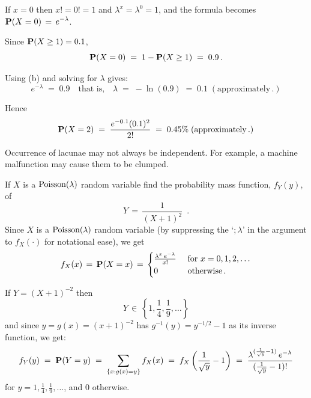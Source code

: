 \begin{ExerciseList}
\item If $x=0$ then $x!=0!=1$ and $\lambda^x=\lambda^0=1$, and the formula becomes  
$\displaystyle \mathbf{P}(X=0) \,=\, e^{-\lambda}$.

\item Since $\mathbf{P}(X \geq 1) = 0.1$, \[\mathbf{P}( X=0)\;=\; 1 -  \mathbf{P}(X \geq 1)\;=\; 0.9\,.\]

Using (b) and solving for $\lambda$ gives:
\[ e^{-\lambda}\;=\; 0.9 \quad \text{that is,}\quad \lambda \;=\; -\ln(0.9) \;=\; 0.1\;
(\text{approximately}\,.)\]

Hence \[\mathbf{P}( X=2 )\;=\;   \frac{e^{-0.1} (0.1)^2}{2!}  \;=\;0.45\% \;
(\text{approximately}\,.) \]

\item Occurrence of lacunae may not always be independent. For example, a machine malfunction may cause them to be clumped.
\ee

\Exercise
If $X$ is a $\mbox{{\rm Poisson}}(\lambda)$ random variable find the probability mass function,  $f_Y (y)$, of
\[
Y\,=\,\frac{1}{(X+1)^{2}} \enspace .
\]
\Answer
Since $X$ is a $\mbox{{\rm Poisson}}(\lambda)$ random variable (by suppressing the `$;\lambda$' in the argument to $f_X(\cdot)$ for notational ease), we get
\[ f_X(x) \,=\, \mathbf{P}(X=x)\,=\, 
\begin{cases}
\frac{\lambda^x \, e^{-\lambda} }{ x!} & \text{ for }  x= 0, 1, 2, \dots \\
0 & \text{ otherwise} \,.
\end{cases}
\]

If $Y=(X+1)^{-2}$ then  \[Y \,\in\, \left\{1, \frac{1}{4}, \frac{1}{9}, \dots \right\} \]
and since $y=g(x)=(x+1)^{-2}$ has $g^{-1}(y)=y^{-1/2}-1$ as its inverse function, we get:
\[
f_Y(y)\;=\; \mathbf{P}(Y=y)\;=\; \sum_{\{ x: g(x)=y\}}f_X(x)  \;=\; f_X\left( \frac{1}{\sqrt y}-1\right) \;=\; \frac{\lambda^{(\frac{1}{\sqrt y} -1)} \, e^{-\lambda}}{(\frac{1}{\sqrt y} -1)!}
\]
for $y = 1, \frac{1}{4}, \frac{1}{9}, \dots $, and $0$ otherwise.


\end{ExerciseList}
